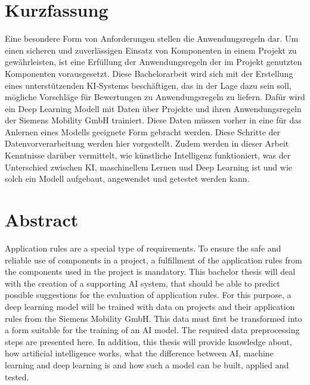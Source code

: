 \section*{Kurzfassung}
Eine besondere Form von Anforderungen stellen die Anwendungsregeln dar. Um einen sicheren und zuverlässigen Einsatz von Komponenten in einem Projekt zu gewährleisten,
ist eine Erfüllung der Anwendungsregeln der im Projekt genutzten Komponenten vorausgesetzt. Diese Bachelorarbeit wird sich mit der Erstellung eines unterstützenden KI-Systems beschäftigen,
das in der Lage dazu sein soll, mögliche Vorschläge für Bewertungen zu Anwendungsregeln zu liefern. Dafür wird ein Deep Learning Modell mit Daten über Projekte und 
ihren Anwendungsregeln der Siemens Mobility GmbH trainiert. Diese Daten müssen vorher in eine für das Anlernen eines Modells geeignete Form 
gebracht werden. Diese Schritte der Datenvorverarbeitung werden hier vorgestellt. Zudem werden in dieser Arbeit Kenntnisse darüber vermittelt, 
wie künstliche Intelligenz funktioniert, was der Unterschied zwischen KI, maschinellem Lernen und Deep Learning ist und wie solch ein Modell aufgebaut, angewendet und getestet werden kann. 

\vfill\vfill\vfill\vfill\vfill\vfill
\section*{Abstract}
Application rules are a special type of requirements. To ensure the safe and reliable use of components in a project,
a fulfillment of the application rules from the components used in the project is mandatory. This bachelor thesis will deal with the creation of a supporting AI system,
that should be able to predict possible suggestions for the evaluation of application rules. For this purpose, a deep learning model will be trained with data on projects and 
their application rules from the Siemens Mobility GmbH. This data must first be transformed into a form suitable for the training of an AI model. 
The required data preprocessing steps are presented here. In addition, this thesis will provide knowledge about, 
how artificial intelligence works, what the difference between AI, machine learning and deep learning is and how such a model can be built, applied and tested.
\vfill\vfill\vfill\vfill\vfill\vfill